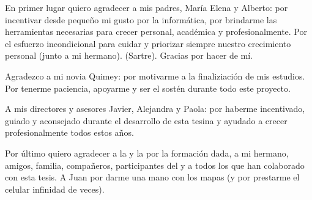 
En primer lugar quiero agradecer a mis padres, María Elena y Alberto: por incentivar desde pequeño mi gusto por la informática, por brindarme las herramientas necesarias para crecer personal, académica y profesionalmente. Por el esfuerzo incondicional para cuidar y priorizar siempre nuestro crecimiento personal (junto a mi hermano).  (Sartre). Gracias por hacer de mí.

Agradezco a mi novia Quimey: por motivarme a la finaliziación de mis estudios. Por tenerme paciencia, apoyarme y ser el sostén durante todo este proyecto.

A mis directores y asesores Javier, Alejandra y Paola: por haberme incentivado, guiado y aconsejado durante el desarrollo de esta tesina y ayudado a crecer profesionalmente todos estos años.

Por último quiero agradecer a la \facultad{} y la \unlp{} por la formación dada, a mi hermano, amigos, familia, compañeros, participantes del  y a todos los que han colaborado con esta tesis. A Juan por darme una mano con los mapas (y por prestarme el celular infinidad de veces).
